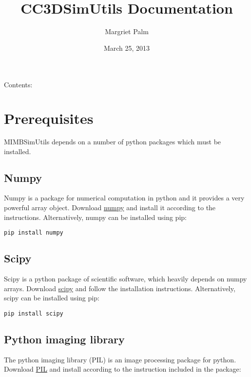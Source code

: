 \documentclass[letterpaper,10pt,english]{sphinxmanual}
\title{CC3DSimUtils Documentation}
\date{March 25, 2013}
\author{Margriet Palm}
\begin{document}
\maketitle
\tableofcontents
{}\label{CC3DSimUtils::doc}


Contents:


\chapter{Prerequisites}
\label{Preq:welcome-to-mimbsimutils-documentation}\label{Preq:prerequisites}\label{Preq::doc}
MIMBSimUtils depends on a number of python packages which must be installed.


\section{Numpy}
\label{Preq:numpy}
Numpy is a package for numerical computation in python and it provides a very powerful array object. Download \href{http://sourceforge.net/projects/numpy/files/}{numpy} and install it according to the instructions. Alternatively, numpy can be installed using pip:

\begin{Verbatim}[commandchars=\\\{\}]
pip install numpy
\end{Verbatim}


\section{Scipy}
\label{Preq:scipy}
Scipy is a python package of scientific software, which heavily depends on numpy arrays. Download \href{http://sourceforge.net/projects/scipy/files/}{scipy} and follow the installation instructions. Alternatively, scipy can be installed using pip:

\begin{Verbatim}[commandchars=\\\{\}]
pip install scipy
\end{Verbatim}


\section{Python imaging library}
\label{Preq:python-imaging-library}
The python imaging library (PIL) is an image processing package for python. Download \href{http://www.pythonware.com/products/pil/\#pil117}{PIL} and install according to the instruction included in the package:
\end{document}

